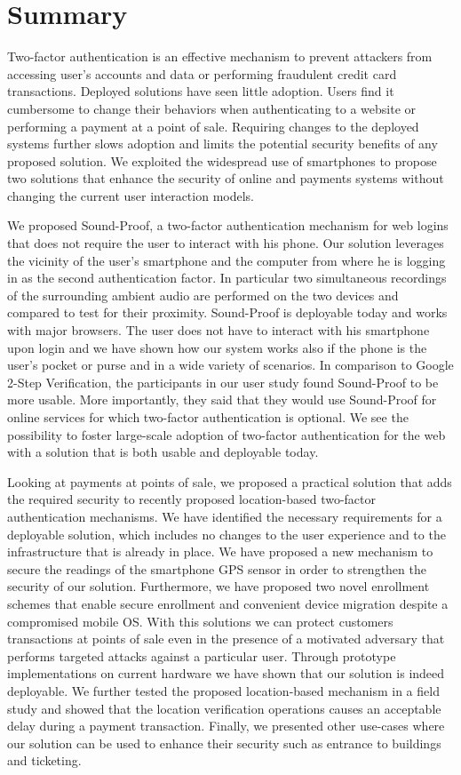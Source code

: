 \chapter{Summary}
\label{chap:ps_summary}

Two-factor authentication is an effective mechanism to prevent attackers from accessing user's accounts and data or performing fraudulent credit card transactions. Deployed solutions have seen little adoption. Users find it cumbersome to change their behaviors when authenticating to a website or performing a payment at a point of sale. Requiring changes to the deployed systems further slows adoption and limits the potential security benefits of any proposed solution. We exploited the widespread use of smartphones to propose two solutions that enhance the security of online and payments systems without changing the current user interaction models.

We proposed Sound-Proof, a two-factor authentication mechanism for web logins that does not require the user to interact with his phone. Our solution leverages the vicinity of the user's smartphone and the computer from where he is logging in as the second authentication factor. In particular two simultaneous recordings of the surrounding ambient audio are performed on the two devices and compared to test for their proximity. Sound-Proof is deployable today and works with major browsers. The user does not have to interact with his smartphone upon login and we have shown how our system works also if the phone is the user's pocket or purse and in a wide variety of scenarios. In comparison to Google 2-Step Verification, the participants in our user study found Sound-Proof to be more usable. More importantly, they said that they would use Sound-Proof for online services for which two-factor authentication is optional. We see the possibility to foster large-scale adoption of two-factor authentication for the web with a solution that is both usable and deployable today.

Looking at payments at points of sale, we proposed a practical solution that adds the required security to recently proposed location-based two-factor authentication mechanisms. We have identified the necessary requirements for a deployable solution, which includes no changes to the user experience and to the infrastructure that is already in place. We have proposed a new mechanism to secure the readings of the smartphone GPS sensor in order to strengthen the security of our solution. Furthermore, we have proposed two novel enrollment schemes that enable secure enrollment and convenient device migration despite a compromised mobile OS. With this solutions we can protect customers transactions at points of sale even in the presence of a motivated adversary that performs targeted attacks against a particular user. Through prototype implementations on current hardware we have shown that our solution is indeed deployable. We further tested the proposed location-based mechanism in a field study and showed that the location verification operations causes an acceptable delay during a payment transaction. Finally, we presented other use-cases where our solution can be used to enhance their security such as entrance to buildings and ticketing.

